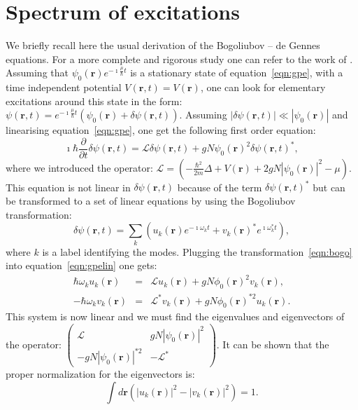 \documentclass[12pt,a4paper]{report}
\newcommand{\abs}[1]{\left|#1\right|}
\begin{document}
\section{Spectrum of excitations}
We briefly recall here the usual derivation of the Bogoliubov -- de Gennes equations. For a more complete and rigorous study one can refer to the work of \cite{Castin2001}.
Assuming that $\psi_0(\bm{r})e^{-\imath\frac{\mu}{\hbar}t}$ is a stationary state of equation~\eqref{eqn:gpe}, with a time independent potential $V(\bm{r},t)=V(\bm{r})$, one can look for elementary excitations around this state in the form: $\psi(\bm{r},t)=e^{-\imath\frac{\mu}{\hbar}t}
\left(\psi_0(\bm{r})+\delta\psi(\bm{r},t)\right)$.
Assuming $\abs{\delta\psi(\bm{r},t)}\ll\abs{\psi_0(\bm{r})}$ and linearising equation~\eqref{eqn:gpe}, one get the following first order equation:
\begin{equation}
\imath\hbar\frac{\partial}{\partial t}\delta\psi(\bm{r},t)
=\mathcal{L}\delta\psi(\bm{r},t)+gN\psi_0(\bm{r})^2\delta\psi(\bm{r},t)^*,
\label{eqn:gpelin}
\end{equation}
where we introduced the operator:
$\mathcal{L}=\left(-\frac{\hbar^2}{2m}\Delta+V(\bm{r})+2gN\abs{\psi_0(\bm{r})}^2-\mu\right)$.
This equation is not linear in $\delta\psi(\bm{r},t)$ because of the term $\delta\psi(\bm{r},t)^*$ but can be transformed to a set of linear equations by using the Bogoliubov transformation:
\begin{equation}
\delta\psi(\bm{r},t)=\sum_k\left(u_k(\bm{r})e^{-\imath\omega_kt}
+v_k(\bm{r})^*e^{\imath\omega_k^*t}\right),
\label{eqn:bogo}
\end{equation}
where $k$ is a label identifying the modes.
Plugging the transformation~\eqref{eqn:bogo} into equation~\eqref{eqn:gpelin} one gets:
\begin{subequations}
\begin{eqnarray}
\hbar\omega_ku_k(\bm{r})&=&\mathcal{L}u_k(\bm{r})+gN\phi_0(\bm{r})^2v_k(\bm{r}),\\
-\hbar\omega_kv_k(\bm{r})&=&\mathcal{L}^*v_k(\bm{r})+gN\phi_0(\bm{r})^{*2}u_k(\bm{r}).
\end{eqnarray}
\end{subequations}
This system is now linear and we must find the eigenvalues and eigenvectors of the operator: $\begin{pmatrix}
\mathcal{L} & gN\abs{\psi_0(\bm{r})}^2\\
-gN\abs{\psi_0(\bm{r})}^{*2} & -\mathcal{L}^*
\end{pmatrix}$.
It can be shown that the proper normalization for the eigenvectors is:
\begin{equation}
\int d\bm{r}\left(\abs{u_k(\bm{r})}^2-\abs{v_k(\bm{r})}^2\right)=1.
\end{equation}
\end{document}
